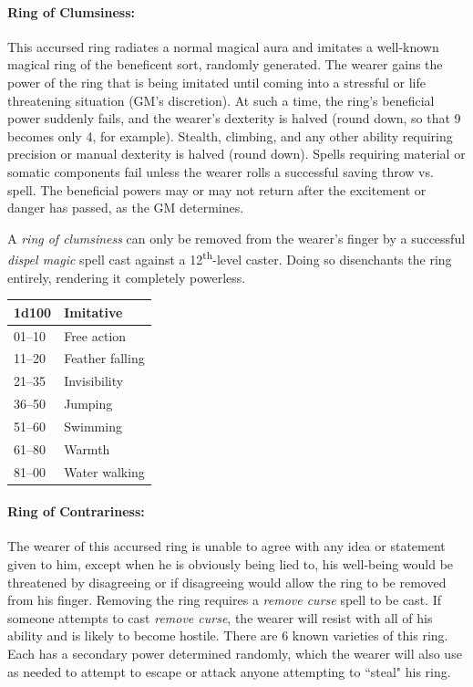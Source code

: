 \begin{multicols}{2}
\paragraph{Ring of Clumsiness:} This accursed ring radiates a normal magical aura and imitates a well-known magical ring of the beneficent sort, randomly generated.  The wearer gains the power of the ring that is being imitated until coming into a stressful or life threatening situation (GM's discretion).  At such a time, the ring's beneficial power suddenly fails, and the wearer's dexterity is halved (round down, so that 9 becomes only 4, for example).  Stealth, climbing, and any other ability requiring precision or manual dexterity is halved (round down).  Spells requiring material or somatic components fail unless the wearer rolls a successful saving throw vs. spell.  The beneficial powers may or may not return after the excitement or danger has passed, as the GM determines.

A \textit{ring of clumsiness} can only be removed from the wearer's finger by a successful \textit{dispel magic} spell cast against a 12\textsuperscript{th}-level caster. Doing so disenchants the ring entirely, rendering it completely powerless.

\noindent
\begin{tabular}{|p{}|p{}|}
\hline
1d100	& Imitative \\
\hline\hline
\rowcolor[gray]{.9}01--10	& Free action \\
11--20	& Feather falling \\
\rowcolor[gray]{.9}21--35	& Invisibility \\
36--50	& Jumping \\
\rowcolor[gray]{.9}51--60	& Swimming \\
61--80	& Warmth \\
\rowcolor[gray]{.9}81--00	& Water walking \\
\hline
\end{tabular}

\paragraph{Ring of Contrariness:}  The wearer of this accursed ring is unable to agree with any idea or statement given to him, except when he is obviously being lied to, his well-being would be threatened by disagreeing or if disagreeing would allow the ring to be removed from his finger.  Removing the ring requires a \textit{remove curse} spell to be cast.  If someone attempts to cast \textit{remove curse}, the wearer will resist with all of his ability and is likely to become hostile.  There are 6 known varieties of this ring.  Each has a secondary power determined randomly, which the wearer will also use as needed to attempt to escape or attack anyone attempting to ``steal" his ring.


\end{multicols}
